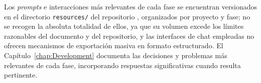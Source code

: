 Los \textit{prompts} e interacciones más relevantes de cada fase se encuentran versionados en el directorio \texttt{resources/} del repositorio \cite{URL::TFG}, organizados por proyecto y fase; no se recogen la absoluta totalidad de ellos, ya que su volumen excede los límites razonables del documento y del repositorio, y las interfaces de chat empleadas no ofrecen mecanismos de exportación masiva en formato estructurado. El Capítulo~\ref{chap:Development} documenta las decisiones y problemas más relevantes de cada fase, incorporando respuestas significativas cuando resulta pertinente.